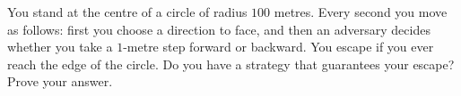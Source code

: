 You stand at the centre of a circle of radius $100$ metres. Every second you move as follows: first you choose a direction to face, and then an adversary decides whether you take a $1$-metre step forward or backward. You escape if you ever reach the edge of the circle. Do you have a strategy that guarantees your escape? Prove your answer.
